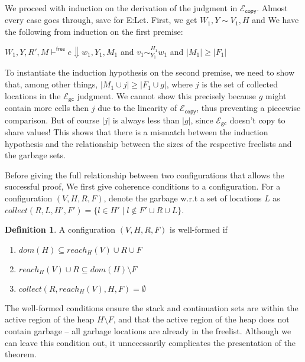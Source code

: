 \documentclass{easychair}
\newcommand{\ms}[1]{\ensuremath{\mathsf{#1}}}
\newcommand{\veq}[4]{#3 \sim^{#1}_{#2} #4}
\newcommand{\gcSem}{\ensuremath{\mathcal{E}_{\ms{gc}}}}
\newcommand{\copySem}{\ensuremath{\mathcal{E}_{\ms{copy}}}}
\theoremstyle{definition}
\newtheorem{definition}{Definition}
\begin{document}
We proceed with induction on the derivation of the judgment in \copySem. 
Almost every case goes through, save for E:Let. 
First, we get $W_1,Y \sim V_1,H$ and We have the following from induction on the first premise:
%
\begin{center}
	 $W_1,Y,R',M \vdash^{\mathsf{free}} e \Downarrow w_1,Y_1,M_1$
   \hspace{3em} and \hspace{3em}	 $\veq{H_1}{Y_1}{v_1}{w_1}$
   \hspace{3em} and \hspace{3em}	 $|M_1| \ge |F_1|$
\end{center}
%
To instantiate the induction hypothesis on the second premise, we need to show that, among 
other things, $|M_1 \cup j| \ge |F_1 \cup g|$, where $j$ is the set of collected locations in 
the \gcSem{} judgment. We cannot show this precisely because $g$ might contain more cells 
then $j$ due to the linearity of \copySem{}, thus preventing a piecewise comparison. 
But of course $|j|$ is always less than $|g|$, since \gcSem{} doesn't copy to share 
values! This shows that there is a mismatch between the induction hypothesis and the relationship
between the sizes of the respective freelists and the garbage sets. 

Before giving the full relationship between two configurations that allows the successful proof,
We first give coherence conditions to a configuration. For a configuration $(V,H,R,F)$, denote the
garbage w.r.t a set of locations $L$ 
as $collect(R,L,H',F') = \{l \in H' \mid l \notin F' \cup R \cup L\}$.

\begin{definition} A configuration $(V,H,R,F)$ is well-formed if 
	\begin{enumerate}
		\item $dom(H) \subseteq reach_H(V) \cup R \cup F$
		\item $reach_H(V) \cup R \subseteq dom(H) \setminus F$
		\item $collect(R,reach_H(V),H,F) = \emptyset$
	\end{enumerate}
\end{definition}

The well-formed conditions ensure the stack and continuation sets are within the active region
of the heap $H \setminus F$, and that
the active region of the heap does not contain garbage -- all garbage locations 
are already in the freelist. Although we can leave this condition out, it unnecessarily 
complicates the presentation of the theorem. 
\end{document}
